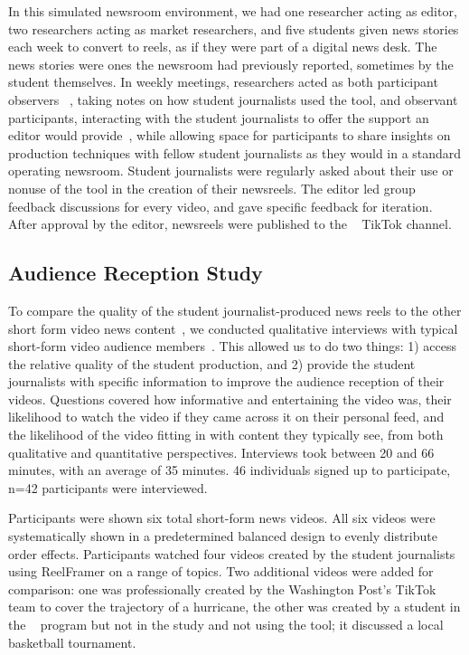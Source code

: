 In this simulated newsroom environment, we had one researcher acting as editor, two researchers acting as market researchers, and five students given news stories each week to convert to reels, as if they were part of a digital news desk. 
The news stories were ones the newsroom had previously reported, sometimes by the student themselves. 
In weekly meetings, researchers acted as both participant observers ~\cite{emerson2011writing}, taking notes on how student journalists used the tool, and observant participants, interacting with the student journalists to offer the support an editor would provide~\cite{seim2024participant}, while allowing space for participants to share insights on production techniques with fellow student journalists as they would in a standard operating newsroom. 
Student journalists were regularly asked about their use or nonuse of the tool in the creation of their newsreels.
The editor led group feedback discussions for every video, and gave specific feedback for iteration. After approval by the editor, newsreels were published to the \nccnews~ TikTok channel.

\subsection{Audience Reception Study}
To compare the quality of the student journalist-produced news reels to the other short form video news content~\cite{shearer2024americans}, we conducted qualitative interviews with typical short-form video audience members~\cite{brennen2021qualitative}. 
This allowed us to do two things: 1) access the relative quality of the student production, and 2) provide the student journalists with specific information to improve the audience reception of their videos. 
Questions covered how informative and entertaining the video was, their likelihood to watch the video if they came across it on their personal feed, and the likelihood of the video fitting in with content they typically see, from both qualitative and quantitative perspectives. 
Interviews took between 20 and 66 minutes, with an average of 35 minutes. 
46 individuals signed up to participate, n=42 participants were interviewed. 

Participants were shown six total short-form news videos. 
All six videos were systematically shown in a predetermined balanced design to evenly distribute order effects.
Participants watched four videos created by the student journalists using ReelFramer on a range of topics.  
Two additional videos were added for comparison: one was professionally created by the Washington Post’s TikTok team to cover the trajectory of a hurricane, the other was created by a student in the \nccnews~ program but not in the study and not using the tool; it discussed a local basketball tournament. 

